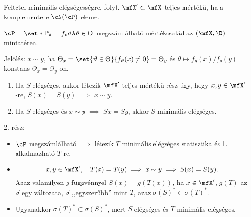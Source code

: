 \documentclass[aspectratio=169,notheorems,9pt,\option]{beamer}
\begin{document}
\begin{frame}{Feltétel minimális elégségességre, folyt.}
  $\mfX'\subset\mfX$ teljes mértékű, ha a komplementere $\cN(\cP)$ eleme.
  \begin{theorem} $\cP=\set*{\P[\theta]=f_\theta d\lambda}{\theta\in\Theta}$ megszámlálható
     mértékcsalád az $(\mfX,\B)$ mintatéren.
     
     Jelölés: $x\sim y$, ha $\Theta_x=\set{\theta\in\Theta}{f_\theta(x)\neq0}=\Theta_y$ és 
     $\theta\mapsto f_\theta(x)/f_{\theta}(y)$ konstans $\Theta_x=\Theta_y$-on.
    \begin{enumerate}[<*>]
      \item Ha $S$ elégséges, akkor létezik $\mfX'$ teljes mértékű rész úgy, 
      hogy $x,y\in\mfX'$-re, $S(x)=S(y)$ $\implies$  $x\sim y$.
      \item Ha $S$ elégséges és $x\sim y$ $\implies$ $Sx=Sy$, akkor $S$ minimális elégséges. 
    \end{enumerate}
  \end{theorem}
  2. rész:
  \begin{itemize}
    \item %
    $\cP$ megszámlálható $\implies$ 
    létezik $T$ minimális elégséges statisztika és 1. alkalmazható $T$-re.
    
    \item %
    \begin{displaymath}
      x,y\in\mfX',\quad T(x)=T(y)
      \implies %
      x\sim y
      \implies
      S(x)=S(y).
    \end{displaymath}
    Azaz valamilyen $g$ függvénnyel $S(x)=g(T(x))$, ha $x\in\mfX'$, $g(T)$ az $S$ egy változata,
    $S$ ,,egyszerűbb'' mint $T$, azaz $\sigma(S)^*\subset\sigma(T)^*$.
    \item Ugyanakkor $\sigma(T)^*\subset\sigma(S)^*$, mert $S$ 
    elégséges és $T$ minimális elégséges.
  \end{itemize}
\end{frame}
\end{document}
